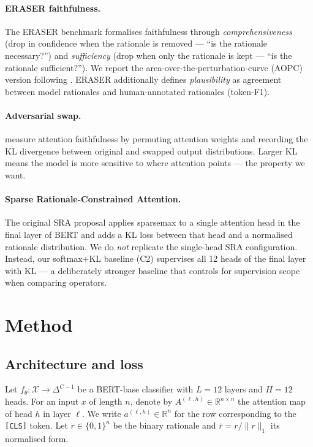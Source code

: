 \documentclass{article}
\begin{document}
\paragraph{ERASER faithfulness.} The ERASER benchmark \citep{deyoung2020eraser} formalises
faithfulness through \emph{comprehensiveness} (drop in confidence when the rationale is
removed --- ``is the rationale necessary?'') and \emph{sufficiency} (drop when only the
rationale is kept --- ``is the rationale sufficient?''). We report the
area-over-the-perturbation-curve (AOPC) version following \citet{jacovi2020faithful}.
ERASER additionally defines \emph{plausibility} as agreement between model rationales
and human-annotated rationales (token-F1).

\paragraph{Adversarial swap.} \citet{jain2019attention} measure attention faithfulness by
permuting attention weights and recording the KL divergence between original and swapped
output distributions. Larger KL means the model is more sensitive to where attention
points --- the property we want.

\paragraph{Sparse Rationale-Constrained Attention.} The original SRA proposal
\citep{eilertsen2025aligning} applies sparsemax to a single attention head in the final
layer of BERT and adds a KL loss between that head and a normalised rationale
distribution. We do \emph{not} replicate the single-head SRA configuration. Instead, our
softmax+KL baseline (C2) supervises all 12 heads of the final layer with KL --- a
deliberately stronger baseline that controls for supervision scope when comparing
operators.

\section{Method}
\label{sec:method}

\subsection{Architecture and loss}

Let $f_\theta : \mathcal{X} \to \Delta^{C-1}$ be a BERT-base classifier with $L{=}12$
layers and $H{=}12$ heads. For an input $x$ of length $n$, denote by
$A^{(\ell,h)} \in \mathbb{R}^{n\times n}$ the attention map of head $h$ in layer $\ell$.
We write $a^{(\ell,h)} \in \mathbb{R}^n$ for the row corresponding to the
\texttt{[CLS]} token. Let $r \in \{0,1\}^n$ be the binary rationale and
$\bar r = r / \|r\|_1$ its normalised form.
\end{document}
